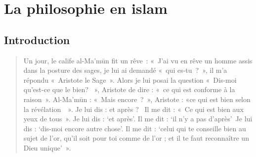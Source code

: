 \chapter{La philosophie en islam}


\section{Introduction
}
\begin{quote}
Un jour, le calife al-Ma'mūn fit un rêve~: «~J'ai vu en rêve un homme
assis dans la posture des sages, je lui ai demandé «~qui es-tu~?~», il
m'a répondu «~Aristote le Sage~». Alors je lui posai la question
«~Dis-moi qu'est-ce que le bien? ~», Aristote de dire : «~ce qui est
conforme à la raison~». Al-Ma'mūn : «~Mais encore~?~», Aristote : «ce
qui est bien selon la révélation~~». Je lui dis : et après ? ~Il me dit
: «~Ce qui est bien aux yeux de tous~». Je lui dis : `et après'. Il me
dit : `il n'y a pas d'après'~Je lui dis : `dis-moi encore autre chose'.
Il me dit : `celui qui te conseille bien au sujet de l'or, qu'il soit
pour toi comme de l'or ; et il te faut reconnaître un Dieu unique'~».
\end{quote}

